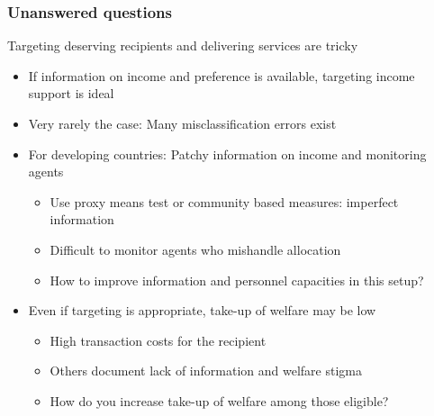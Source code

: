 \documentclass[aspectratio=169]{beamer}
\begin{document}
\begin{frame}
\frametitle{Unanswered questions} 
Targeting deserving recipients and delivering services are tricky
\begin{itemize}\setlength\itemsep{3pt}
\item If information on income and preference is available, targeting income support is ideal
\item Very rarely the case: Many misclassification errors exist
\item For developing countries: Patchy information on income and monitoring agents
\begin{itemize}\setlength\itemsep{3pt}
\item Use proxy means test or community based measures: imperfect information
\item Difficult to monitor agents who mishandle allocation
\item How to improve information and personnel capacities in this setup?
\end{itemize}
\item Even if targeting is appropriate, take-up of welfare may be low
\begin{itemize}\setlength\itemsep{3pt}
\item High transaction costs for the recipient
\item Others document lack of information and welfare stigma
\item How do you increase take-up of welfare among those eligible?
\end{itemize}\medskip
\end{itemize}
\end{frame}
\end{document}
